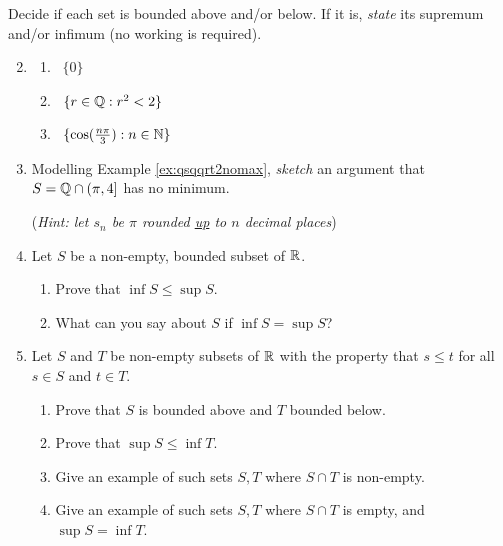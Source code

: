 \begin{exercisessec}{}{}
	\exstart %
	Decide if each set is bounded above and/or below. If it is, \emph{state} its supremum and/or infimum (no working is required).
	\begin{enumerate}\setcounter{enumi}{1}
	  \item[]\begin{enumerate}
	    \item {}  \ $\{0\}$
	    \setcounter{enumii}{3}
	    \item {}  \ $\{r\in\mathbb{Q}:r^2<2\}$
	    \setcounter{enumii}{6}
	    \item {}  \ $\{\cos(\frac{n\pi}3):n\in\mathbb{N}\}$
  \end{enumerate}

  
  	\item Modelling Example \ref{ex:qsqqrt2nomax}, \emph{sketch} an argument that $S=\mathbb{Q}\cap (\pi,4]$ has no minimum.\par
  	(\emph{Hint: let $s_n$ be $\pi$ rounded \underline{up} to $n$ decimal places})
  
		\item %
		Let $S$ be a non-empty, bounded subset of $\mathbb{R}$.
  	\begin{enumerate}
		  \item Prove that $\inf S\le \sup S$. %
		  \item What can you say about $S$ if $\inf S=\sup S$?
  	\end{enumerate}
  
	  \item %
	  Let $S$ and $T$ be non-empty subsets of $\mathbb{R}$ with the property that $s\le t$ for all $s\in S$ and $t\in T$.
	  \begin{enumerate}
		  \item Prove that $S$ is bounded above and $T$ bounded below.
		  \item Prove that $\sup S\le \inf T$.
		  \item Give an example of such sets $S,T$ where $S\cap T$ is non-empty.
		  \item Give an example of such sets $S,T$ where $S\cap T$ is empty, and $\sup S=\inf T$.
	  \end{enumerate}
  

\end{enumerate}
\end{exercisessec}
